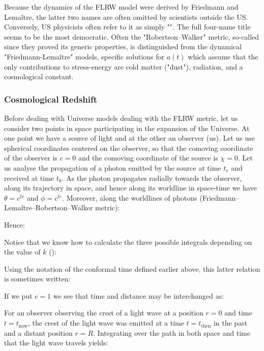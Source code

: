 	Because the dynamics of the FLRW model were derived by Friedmann and Lemaître, the latter two names are often omitted by scientists outside the US. Conversely, US physicists often refer to it as simply "". The full four-name title seems to be the most democratic. Often the "Robertson–Walker" metric, so-called since they proved its generic properties, is distinguished from the dynamical "Friedmann-Lemaître" models, specific solutions for $a(t)$ which assume that the only contributions to stress-energy are cold matter ("dust"), radiation, and a cosmological constant.
	
	\pagebreak
	\subsubsection{Cosmological Redshift}\label{cosmological redshift}
	Before dealing with Universe models dealing with the FLRW metric, let us consider two points in space participating in the expansion of the Universe. At one point we have a source of light and at the other an observer (us). Let us use spherical coordinates centered on the observer, so that the comoving coordinate of the observer is $c = 0$ and the comoving coordinate of the source is $\chi=0$. Let us analyse the propagation of a photon emitted by the source at time $t_e$ and received at time $t_0$. As the photon propagates radially towards the observer, along its trajectory in space, and hence along its worldline in space-time we have $\theta=c^{te}$ and $\phi =c^{te}$. Moreover, along the worldlines of photons (Friedmann–Lemaître–Robertson–Walker metric):
	
	Hence:
	
	Notice that we know how to calculate the three possible integrals depending on the value of $k$ ():
	
	 \begin{tcolorbox}[title=Remark,colframe=black,arc=10pt]
	Using the notation of the conformal time defined earlier above, this latter relation is sometimes written:
	
	If we put $c=1$ we see that time and distance may be interchanged as:
	
	\end{tcolorbox}
	For an observer observing the crest of a light wave at a position $r = 0$ and time $t = t_\text{now}$, the crest of the light wave was emitted at a time $t = t_\text{then}$ in the past and a distant position $r = R$. Integrating over the path in both space and time that the light wave travels yields:
	
